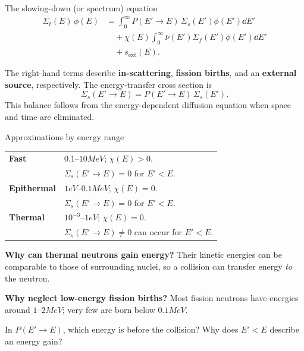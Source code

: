 \begin{handoutcolumns}
\begin{fixedbox}{The slowing-down (or spectrum) equation}
\begin{align*}
\Sigma_t(E)\,\phi(E)
 &=\int_0^\infty P(E'\!\to\!E)\,\Sigma_s(E')\phi(E')\dd E'\\
 &\quad+\chi(E)\int_0^\infty\bar\nu(E')\Sigma_f(E')\phi(E')\dd E'\\
 &\quad+s_{\mathrm{ext}}(E).
\end{align*}
\end{fixedbox}

The right-hand terms describe \textbf{in-scattering}, \textbf{fission
births}, and an \textbf{external source}, respectively. The
energy-transfer cross section is
$$
\Sigma_s(E'\!\to\!E)=P(E'\!\to\!E)\,\Sigma_s(E').
$$
This balance follows from the energy-dependent diffusion equation
when space and time are eliminated.

\begin{fixedbox}{Approximations by energy range}
\renewcommand{\arraystretch}{1.13}
\setlength{\tabcolsep}{3pt}
\begin{tabularx}{\linewidth}{@{}l >{\raggedright\arraybackslash}X@{}}
\textbf{Fast} & $0.1$--$10\unit{MeV}$; $\chi(E)>0$.\\
 & $\Sigma_s(E'\!\to\!E)=0$ for $E'<E$.\\[3pt]
\textbf{Epithermal} & $1\unit{eV}$--$0.1\unit{MeV}$; $\chi(E)=0$.\\
 & $\Sigma_s(E'\!\to\!E)=0$ for $E'<E$.\\[3pt]
\textbf{Thermal} & $10^{-3}$--$1\unit{eV}$; $\chi(E)=0$.\\
 & $\Sigma_s(E'\!\to\!E)\ne0$ can occur for $E'<E$.
\end{tabularx}
\end{fixedbox}

\textbf{Why can thermal neutrons gain energy?}
Their kinetic energies can be comparable to those of surrounding
nuclei, so a collision can transfer energy \emph{to} the neutron.

\textbf{Why neglect low-energy fission births?}
Most fission neutrons have energies around $1$--$2\unit{MeV}$;
very few are born below $0.1\unit{MeV}$.

\begin{checkpoint}
In $P(E'\!\to\!E)$, which energy is before the collision? Why does
$E'<E$ describe an energy gain?
\end{checkpoint}
\end{handoutcolumns}

